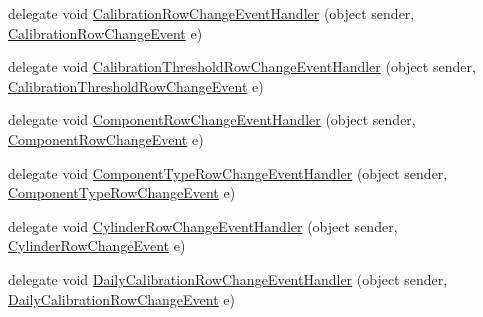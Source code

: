\begin{DoxyCompactItemize}
\item 
delegate void \hyperlink{class_env_int_1_1_win32_1_1_field_tech_1_1_manager_1_1_data_sets_1_1_guide_ware_mobile_data_set_a86b53257f620f53ee62af7c3677d9475}{Calibration\+Row\+Change\+Event\+Handler} (object sender, \hyperlink{class_env_int_1_1_win32_1_1_field_tech_1_1_manager_1_1_data_sets_1_1_guide_ware_mobile_data_set_84870cfb39b084eaa7965416caa9d277}{Calibration\+Row\+Change\+Event} e)
\item 
delegate void \hyperlink{class_env_int_1_1_win32_1_1_field_tech_1_1_manager_1_1_data_sets_1_1_guide_ware_mobile_data_set_a2a61338e8d68c897b004fe6fa4479d4e}{Calibration\+Threshold\+Row\+Change\+Event\+Handler} (object sender, \hyperlink{class_env_int_1_1_win32_1_1_field_tech_1_1_manager_1_1_data_sets_1_1_guide_ware_mobile_data_set_fbaa872ead219fa1546c6a3dbe0bab70}{Calibration\+Threshold\+Row\+Change\+Event} e)
\item 
delegate void \hyperlink{class_env_int_1_1_win32_1_1_field_tech_1_1_manager_1_1_data_sets_1_1_guide_ware_mobile_data_set_ab767e59a10801c8c87ea9efc7cbfbd8b}{Component\+Row\+Change\+Event\+Handler} (object sender, \hyperlink{class_env_int_1_1_win32_1_1_field_tech_1_1_manager_1_1_data_sets_1_1_guide_ware_mobile_data_set_1_1_component_row_change_event}{Component\+Row\+Change\+Event} e)
\item 
delegate void \hyperlink{class_env_int_1_1_win32_1_1_field_tech_1_1_manager_1_1_data_sets_1_1_guide_ware_mobile_data_set_abd1972df64c9aa03de1019f79a6c4631}{Component\+Type\+Row\+Change\+Event\+Handler} (object sender, \hyperlink{class_env_int_1_1_win32_1_1_field_tech_1_1_manager_1_1_data_sets_1_1_guide_ware_mobile_data_set_6cb4a1a3a59d09909759d45113e3e872}{Component\+Type\+Row\+Change\+Event} e)
\item 
delegate void \hyperlink{class_env_int_1_1_win32_1_1_field_tech_1_1_manager_1_1_data_sets_1_1_guide_ware_mobile_data_set_a8633b3d698f0ad882a4faeba4841f6ee}{Cylinder\+Row\+Change\+Event\+Handler} (object sender, \hyperlink{class_env_int_1_1_win32_1_1_field_tech_1_1_manager_1_1_data_sets_1_1_guide_ware_mobile_data_set_1_1_cylinder_row_change_event}{Cylinder\+Row\+Change\+Event} e)
\item 
delegate void \hyperlink{class_env_int_1_1_win32_1_1_field_tech_1_1_manager_1_1_data_sets_1_1_guide_ware_mobile_data_set_a6595251b6d65dffbbe61ca816dadb518}{Daily\+Calibration\+Row\+Change\+Event\+Handler} (object sender, \hyperlink{class_env_int_1_1_win32_1_1_field_tech_1_1_manager_1_1_data_sets_1_1_guide_ware_mobile_data_set_3eedff0336860edbfd90e1bca2652873}{Daily\+Calibration\+Row\+Change\+Event} e)

\end{DoxyCompactItemize}
